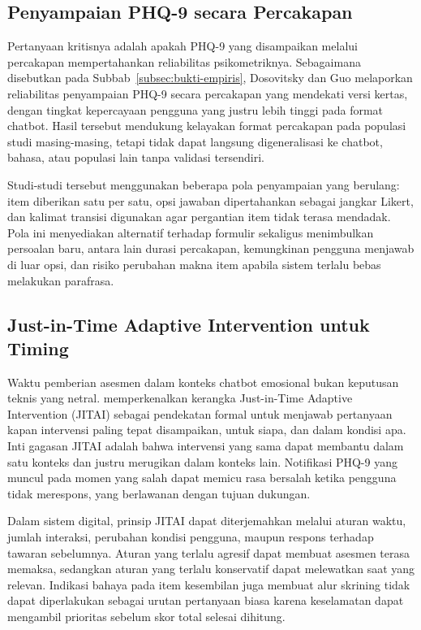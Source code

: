 \subsection{Penyampaian PHQ-9 secara Percakapan}
\label{subsec:phq9-delivery}

Pertanyaan kritisnya adalah apakah PHQ-9 yang disampaikan melalui percakapan mempertahankan reliabilitas psikometriknya. Sebagaimana disebutkan pada Subbab~\ref{subsec:bukti-empiris}, Dosovitsky dan Guo melaporkan reliabilitas penyampaian PHQ-9 secara percakapan yang mendekati versi kertas, dengan tingkat kepercayaan pengguna yang justru lebih tinggi pada format chatbot. Hasil tersebut mendukung kelayakan format percakapan pada populasi studi masing-masing, tetapi tidak dapat langsung digeneralisasi ke chatbot, bahasa, atau populasi lain tanpa validasi tersendiri.

Studi-studi tersebut menggunakan beberapa pola penyampaian yang berulang: item diberikan satu per satu, opsi jawaban dipertahankan sebagai jangkar Likert, dan kalimat transisi digunakan agar pergantian item tidak terasa mendadak. Pola ini menyediakan alternatif terhadap formulir sekaligus menimbulkan persoalan baru, antara lain durasi percakapan, kemungkinan pengguna menjawab di luar opsi, dan risiko perubahan makna item apabila sistem terlalu bebas melakukan parafrasa.

\subsection{Just-in-Time Adaptive Intervention untuk Timing}
\label{subsec:jitai}

Waktu pemberian asesmen dalam konteks chatbot emosional bukan keputusan teknis yang netral. \textcite{nahumshani2018jitai} memperkenalkan kerangka Just-in-Time Adaptive Intervention (JITAI) sebagai pendekatan formal untuk menjawab pertanyaan kapan intervensi paling tepat disampaikan, untuk siapa, dan dalam kondisi apa. Inti gagasan JITAI adalah bahwa intervensi yang sama dapat membantu dalam satu konteks dan justru merugikan dalam konteks lain. Notifikasi PHQ-9 yang muncul pada momen yang salah dapat memicu rasa bersalah ketika pengguna tidak merespons, yang berlawanan dengan tujuan dukungan.

Dalam sistem digital, prinsip JITAI dapat diterjemahkan melalui aturan waktu, jumlah interaksi, perubahan kondisi pengguna, maupun respons terhadap tawaran sebelumnya. Aturan yang terlalu agresif dapat membuat asesmen terasa memaksa, sedangkan aturan yang terlalu konservatif dapat melewatkan saat yang relevan. Indikasi bahaya pada item kesembilan juga membuat alur skrining tidak dapat diperlakukan sebagai urutan pertanyaan biasa karena keselamatan dapat mengambil prioritas sebelum skor total selesai dihitung.

